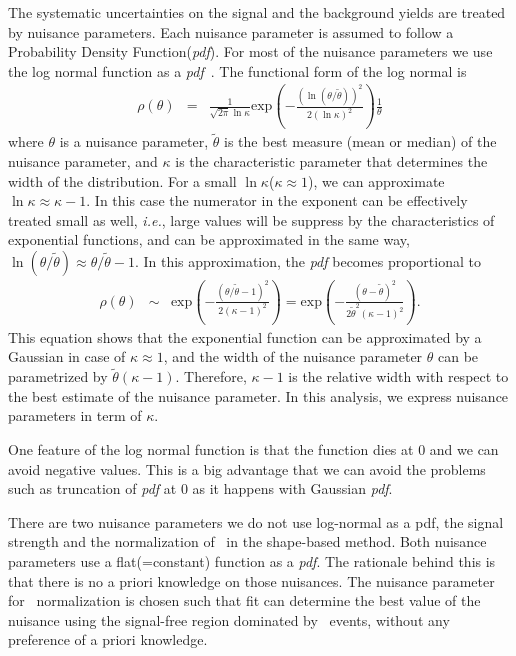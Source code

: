 The systematic uncertainties on the signal and the background yields are 
treated by nuisance parameters. Each nuisance parameter is assumed to follow 
a Probability Density Function(\textit{pdf}).
For most of the nuisance parameters we use the log normal function as a 
\textit{pdf}~\cite{combination_stat}. The functional form of the log normal is 
\begin{eqnarray} 
\rho(\theta) 
&=& 
\frac{1}{\sqrt{2\pi}\ln\kappa}  
\textrm{exp} \left( - \frac{\left( \ln(\theta/\tilde{\theta})\right)^2}
                           {2(\ln\kappa)^2}  \right) 
\frac{1}{\theta}  
\end{eqnarray} 
where $\theta$ is a nuisance parameter, $\tilde{\theta}$ is the best measure 
(mean or median) of the nuisance parameter, and $\kappa$ is the characteristic 
parameter that determines the width of the distribution. 
For a small $\ln\kappa$($\kappa \approx 1$), we can approximate $\ln\kappa \approx \kappa - 1$.
In this case the numerator in the exponent can be effectively treated small as well,
\textit{i.e.}, large values will be suppress by the characteristics of exponential functions,  
and can be approximated in the same way, $\ln (\theta/\tilde{\theta}) \approx \theta/\tilde{\theta} - 1$.
In this approximation, the \textit{pdf} becomes proportional to 
\begin{eqnarray} 
\rho(\theta) 
&\sim&
\textrm{exp} \left( - \frac{\left( \theta/\tilde{\theta} - 1 \right)^2}
                           {2( \kappa - 1)^2}  \right)  
= 
\textrm{exp} \left( - \frac{\left( \theta - \tilde{\theta} \right)^2}
                           {2\tilde{\theta}^2 ( \kappa - 1)^2}  \right).  
\end{eqnarray} 
This equation shows that the exponential function can be 
approximated by a Gaussian in case of $\kappa \approx 1$, and the width 
of the nuisance parameter $\theta$ can be parametrized by $\tilde{\theta}( \kappa - 1)$.
Therefore, $\kappa - 1$ is the relative width with respect to the best 
estimate of the nuisance parameter. In this analysis, we express nuisance parameters 
in term of $\kappa$.

One feature of the log normal function is that the function dies at 0
and we can avoid negative values. This is a big advantage that we can avoid 
the problems such as truncation of \textit{pdf} at 0 as it happens with Gaussian \textit{pdf}.    

There are two nuisance parameters we do not use log-normal as a pdf, 
the signal strength and the normalization of \qqww\ in the shape-based method. 
Both nuisance parameters use a flat(=constant) function as a \textit{pdf}.  
The rationale behind this is that there is no a priori knowledge on those 
nuisances. The nuisance parameter for \qqww\ normalization is chosen 
such that fit can determine the best value of the nuisance using 
the signal-free region dominated by \qqww\ events, without any preference 
of a priori knowledge. 

